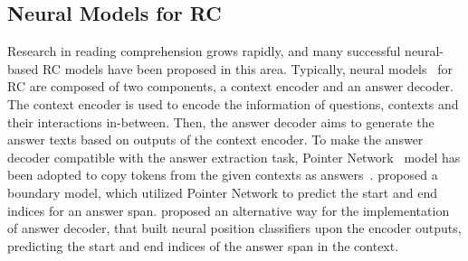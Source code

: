 \documentclass[a4paper,fleqn,twocolumn]{cas-dc}
\newcommand{\1}[1]{\mathds{1}\left[#1\right]}
\newcommand{\secref}[1]{Section \ref{#1}}
\newcommand{\ZY}[1]{\textcolor{red}{Zhiyi: #1}}
\begin{document}
\subsection{Neural Models for RC}
Research in reading comprehension grows rapidly, and many successful neural-based RC models have been proposed in this area. 
Typically, neural  models~\citep{DBLP:conf/aaai/PangLGXSC19,DBLP:conf/iclr/Wang017a,DBLP:conf/iclr/XiongZS17} for RC are composed of two components, a context encoder and an answer decoder. 
The context encoder is used to encode the information of questions, contexts and their interactions in-between. Then, the answer decoder aims to generate the answer texts based on outputs of the context encoder. 
To make the answer decoder compatible with the answer extraction task, 
Pointer Network~\citep{DBLP:conf/nips/VinyalsFJ15} model has been adopted to
copy tokens from the given contexts as answers~\citep{DBLP:conf/acl/KadlecSBK16,DBLP:conf/emnlp/TrischlerYYBSS16}.
\cite{DBLP:conf/iclr/Wang017a} proposed a boundary model, which utilized Pointer Network to predict the start and end indices for an answer span.
\cite{DBLP:conf/iclr/SeoKFH17} proposed an alternative way for the implementation of answer decoder, that built neural position classifiers upon the encoder outputs, predicting the start and end indices of the answer span in the context.
\end{document}
